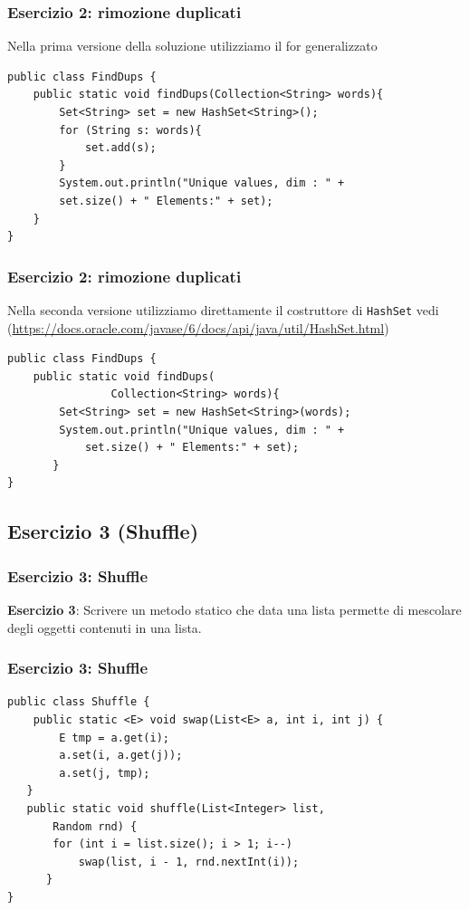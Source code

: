 \documentclass{beamer}
\begin{document}
\begin{frame}[fragile]
\frametitle{Esercizio 2: rimozione duplicati}
Nella prima versione della soluzione utilizziamo il for generalizzato
\begin{framed}
\begin{lstlisting}
public class FindDups {
    public static void findDups(Collection<String> words){
	    Set<String> set = new HashSet<String>();
	    for (String s: words){
	        set.add(s);
	    }
	    System.out.println("Unique values, dim : " + 
		set.size() + " Elements:" + set);
	}
}
\end{lstlisting}
\end{framed}
\end{frame}

\begin{frame}[fragile]
\frametitle{Esercizio 2: rimozione duplicati}
Nella seconda versione utilizziamo direttamente il costruttore di \texttt{HashSet} vedi (\url{https://docs.oracle.com/javase/6/docs/api/java/util/HashSet.html})
\begin{framed}
\begin{lstlisting}
public class FindDups {
    public static void findDups(
                Collection<String> words){
        Set<String> set = new HashSet<String>(words);
        System.out.println("Unique values, dim : " + 
            set.size() + " Elements:" + set);
       }
}
\end{lstlisting}
\end{framed}
\end{frame}

\subsection{Esercizio 3 (Shuffle)}
\begin{frame}[fragile]
\frametitle{Esercizio 3: Shuffle}
\begin{framed}
\textbf{Esercizio 3}: Scrivere un metodo statico che data una lista permette di mescolare degli oggetti contenuti in una lista.
\end{framed}
\end{frame}

\begin{frame}[fragile]
\frametitle{Esercizio 3: Shuffle}
\begin{framed}
\begin{lstlisting}
public class Shuffle {
    public static <E> void swap(List<E> a, int i, int j) {
        E tmp = a.get(i);
        a.set(i, a.get(j));
        a.set(j, tmp);
   }
   public static void shuffle(List<Integer> list, 
       Random rnd) {
       for (int i = list.size(); i > 1; i--)
           swap(list, i - 1, rnd.nextInt(i));
      }
}
\end{lstlisting}
\end{framed}
\end{frame}
\end{document}
